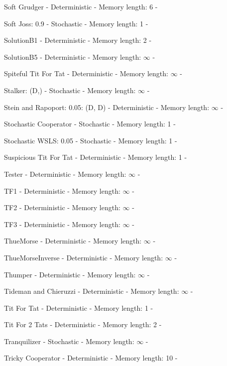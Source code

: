 \item Soft Grudger - Deterministic - Memory length: 6 - \cite{Li2011}
\item Soft Joss: 0.9 - Stochastic - Memory length: 1 - \cite{Prison1998}
\item SolutionB1 - Deterministic - Memory length: 2 - \cite{Ashlock2015}
\item SolutionB5 - Deterministic - Memory length: \(\infty\) - \cite{Ashlock2015}
\item Spiteful Tit For Tat - Deterministic - Memory length: \(\infty\) - \cite{Prison1998}
\item Stalker: (D,) - Stochastic - Memory length: \(\infty\) - \cite{Andre2013}
\item Stein and Rapoport: 0.05: (D, D) - Deterministic - Memory length: \(\infty\) - \cite{Axelrod1980}
\item Stochastic Cooperator - Stochastic - Memory length: 1 - \cite{Adami2013}
\item Stochastic WSLS: 0.05 - Stochastic - Memory length: 1 - \cite{Amaral2016}
\item Suspicious Tit For Tat - Deterministic - Memory length: 1 - \cite{Beaufils1997, Hilbe2013}
\item Tester - Deterministic - Memory length: \(\infty\) - \cite{Axelrod1980b}
\item TF1 - Deterministic - Memory length: \(\infty\) - \cite{Knight2018}
\item TF2 - Deterministic - Memory length: \(\infty\) - \cite{Knight2018}
\item TF3 - Deterministic - Memory length: \(\infty\) - \cite{Knight2018}
\item ThueMorse - Deterministic - Memory length: \(\infty\) - \cite{Knight2018}
\item ThueMorseInverse - Deterministic - Memory length: \(\infty\) - \cite{Knight2018}
\item Thumper - Deterministic - Memory length: \(\infty\) - \cite{Ashlock2008}
\item Tideman and Chieruzzi - Deterministic - Memory length: \(\infty\) - \cite{Axelrod1980}
\item Tit For Tat - Deterministic - Memory length: 1 - \cite{Axelrod1980}
\item Tit For 2 Tats - Deterministic - Memory length: 2 - \cite{Axelrod1984}
\item Tranquilizer - Stochastic - Memory length: \(\infty\) - \cite{Axelrod1980}
\item Tricky Cooperator - Deterministic - Memory length: 10 - \cite{Knight2018}
